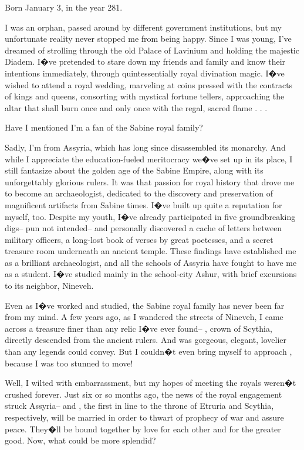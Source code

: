 \documentclass[char]{Kos}
\begin{document}
\name{\cArcheologist{}}

Born January 3, in the year 281.

I was an orphan, passed around by different government institutions, but my unfortunate reality never stopped me from being happy. Since I was young, I've dreamed of strolling through the old Palace of Lavinium and holding the majestic Diadem. I�ve pretended to stare down my friends and family and know their intentions immediately, through quintessentially royal divination magic. I�ve wished to attend a royal wedding, marveling at coins pressed with the contracts of kings and queens, consorting with mystical fortune tellers, approaching the altar that shall burn once and only once with the regal, sacred flame . . .

Have I mentioned I'm a fan of the Sabine royal family?

Sadly, I'm from Assyria, which has long since disassembled its monarchy. And while I appreciate the education-fueled meritocracy we�ve set up in its place, I still fantasize about the golden age of the Sabine Empire, along with its unforgettably glorious rulers. It was that passion for royal history that drove me to become an archaeologist, dedicated to the discovery and preservation of magnificent artifacts from Sabine times. I�ve built up quite a reputation for myself, too. Despite my youth, I�ve already participated in five groundbreaking digs-- pun not intended-- and personally discovered a cache of letters between military officers, a long-lost book of verses by great poetesses, and a secret treasure room underneath an ancient temple. These findings have established me as a brilliant archaeologist, and all the schools of Assyria have fought to have me as a student. I�ve studied mainly in the school-city Ashur, with brief excursions to its neighbor, Nineveh.

Even as I�ve worked and studied, the Sabine royal family has never been far from my mind. A few years ago, as I wandered the streets of Nineveh, I came across a treasure finer than any relic I�ve ever found-- \cBride{\name}, crown \cBride{\prince} of Scythia, directly descended from the ancient rulers. And \cBride{\they} was gorgeous, elegant, lovelier than any legends could convey. But I couldn�t even bring myself to approach \cBride{\them}, because I was too stunned to move!

Well, I wilted with embarrassment, but my hopes of meeting the royals weren�t crushed forever. Just six or so months ago, the news of the royal engagement struck Assyria-- \cBride{\nickname} and \cGroom{\name}, the first in line to the throne of Etruria and Scythia, respectively, will be married in order to thwart of prophecy of war and assure peace. They�ll be bound together by love for each other and for the greater good. Now, what could be more splendid?
\end{document}
